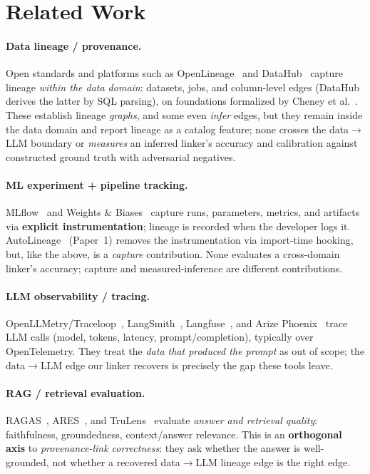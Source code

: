 \documentclass[11pt]{article}
\newcommand{\dto}{\ensuremath{\rightarrow}}     %
\begin{document}
\section{Related Work}

\paragraph{Data lineage / provenance.} Open standards and platforms such as OpenLineage~\cite{openlineage}
and DataHub~\cite{datahub} capture lineage \emph{within the data domain}: datasets, jobs, and
column-level edges (DataHub derives the latter by SQL parsing), on foundations formalized by Cheney et
al.~\cite{cheney2009provenance}. These establish lineage \emph{graphs}, and some even \emph{infer} edges,
but they remain inside the data domain and report lineage as a catalog feature; none crosses the
data\dto{}LLM boundary or \emph{measures} an inferred linker's accuracy and calibration against constructed
ground truth with adversarial negatives.

\paragraph{ML experiment + pipeline tracking.} MLflow~\cite{zaharia2018mlflow} and Weights \&
Biases~\cite{wandb} capture runs, parameters, metrics, and artifacts via \textbf{explicit instrumentation}; lineage is recorded when the developer logs it. AutoLineage~\cite{vg2026autolineage} (Paper~1) removes
the instrumentation via import-time hooking, but, like the above, is a \emph{capture} contribution. None
evaluates a cross-domain linker's accuracy; capture and measured-inference are different contributions.

\paragraph{LLM observability / tracing.} OpenLLMetry/Traceloop~\cite{openllmetry},
LangSmith~\cite{langsmith}, Langfuse~\cite{langfuse}, and Arize Phoenix~\cite{phoenix} trace LLM calls (model, tokens, latency, prompt/completion), typically over OpenTelemetry. They treat the \emph{data that
produced the prompt} as out of scope; the data\dto{}LLM edge our linker recovers is precisely the gap these
tools leave.

\paragraph{RAG / retrieval evaluation.} RAGAS~\cite{es2024ragas}, ARES~\cite{saadfalcon2024ares}, and
TruLens~\cite{trulens} evaluate \emph{answer and retrieval quality}: faithfulness, groundedness,
context/answer relevance. This is an \textbf{orthogonal axis} to \emph{provenance-link correctness}: they
ask whether the answer is well-grounded, not whether a recovered data\dto{}LLM lineage edge is the right
edge.
\end{document}
